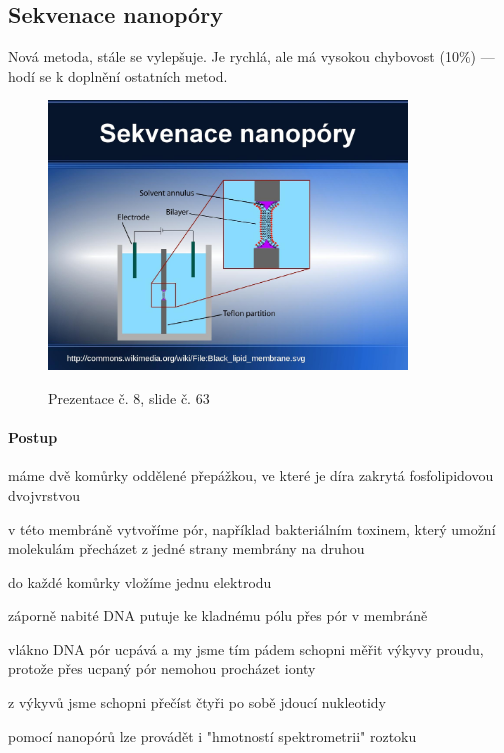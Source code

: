 \documentclass[DIV=8]{scrreprt}
\begin{document}
\subsection{Sekvenace nanopóry} \label{Sekvenace nanopóry}


Nová metoda, stále se vylepšuje. Je rychlá, ale má vysokou chybovost (10\%) --- hodí se k doplnění ostatních metod.

\begin{figure}
    \caption{Prezentace č. 8, slide č. 63}
    \includegraphics[width=0.85\textwidth]{slides-8/slide-63.jpg}
    \centering
    \label{slides-8-slide-63}
\end{figure}

\paragraph{Postup}
\begin{myEnumerate}[nosep]
    \item máme dvě komůrky oddělené přepážkou, ve které je díra zakrytá fosfolipidovou dvojvrstvou
    \item v této membráně vytvoříme pór, například bakteriálním toxinem, který umožní molekulám přecházet z jedné strany membrány na druhou
    \item do každé komůrky vložíme jednu elektrodu
    \item záporně nabité DNA putuje ke kladnému pólu přes pór v membráně
    \item vlákno DNA pór ucpává a my jsme tím pádem schopni měřit výkyvy proudu, protože přes ucpaný pór nemohou procházet ionty
\begin{myItemize}[nosep]
    \item z výkyvů jsme schopni přečíst čtyři po sobě jdoucí nukleotidy
    \item pomocí nanopórů lze provádět i "hmotností spektrometrii" roztoku
\end{myItemize}

\end{myEnumerate}
\end{document}
